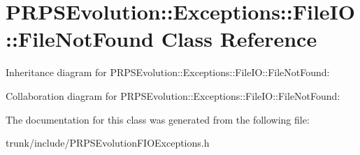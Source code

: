 \hypertarget{class_p_r_p_s_evolution_1_1_exceptions_1_1_file_i_o_1_1_file_not_found}{\section{P\-R\-P\-S\-Evolution\-:\-:Exceptions\-:\-:File\-I\-O\-:\-:File\-Not\-Found Class Reference}
\label{class_p_r_p_s_evolution_1_1_exceptions_1_1_file_i_o_1_1_file_not_found}
}


Inheritance diagram for P\-R\-P\-S\-Evolution\-:\-:Exceptions\-:\-:File\-I\-O\-:\-:File\-Not\-Found\-:


Collaboration diagram for P\-R\-P\-S\-Evolution\-:\-:Exceptions\-:\-:File\-I\-O\-:\-:File\-Not\-Found\-:


The documentation for this class was generated from the following file\-:\begin{DoxyCompactItemize}
\item 
trunk/include/P\-R\-P\-S\-Evolution\-F\-I\-O\-Exceptions.\-h\end{DoxyCompactItemize}
